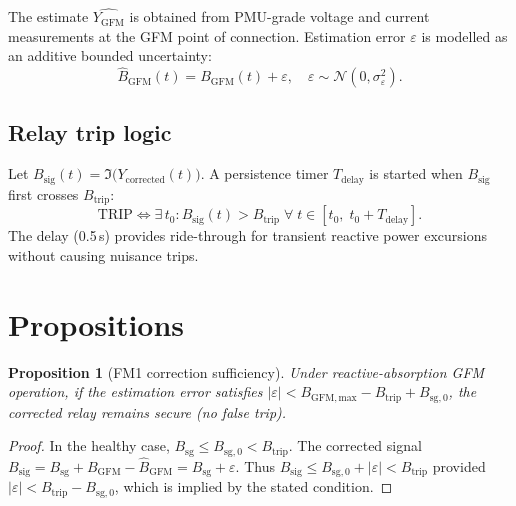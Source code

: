 \documentclass[11pt,a4paper]{article}
\newtheorem{proposition}{Proposition}
\newcommand{\YGFM}{Y_{\mathrm{GFM}}}
\newcommand{\Btrip}{B_{\mathrm{trip}}}
\begin{document}
The estimate $\widehat{\YGFM}$ is obtained from PMU-grade voltage and current
measurements at the GFM point of connection.  Estimation error $\varepsilon$
is modelled as an additive bounded uncertainty:
\begin{equation}
  \widehat{B}_{\mathrm{GFM}}(t) = B_{\mathrm{GFM}}(t) + \varepsilon, \quad
  \varepsilon \sim \mathcal{N}(0, \sigma_\varepsilon^2).
  \label{eq:est_error}
\end{equation}

\subsection{Relay trip logic}
\label{sec:trip}

Let $B_{\mathrm{sig}}(t) = \Im\bigl(Y_{\mathrm{corrected}}(t)\bigr)$.  A
persistence timer $T_{\mathrm{delay}}$ is started when $B_{\mathrm{sig}}$
first crosses $\Btrip$:
\begin{equation}
  \text{TRIP} \iff \exists\, t_0 : B_{\mathrm{sig}}(t) > \Btrip
  \;\forall\; t \in [t_0,\; t_0 + T_{\mathrm{delay}}].
  \label{eq:trip}
\end{equation}
The delay (0.5\,s) provides ride-through for transient reactive power
excursions without causing nuisance trips.

\section{Propositions}
\label{sec:propositions}

\begin{proposition}[FM1 correction sufficiency]
  \label{prop:fm1}
  Under reactive-absorption GFM operation, if the estimation error satisfies
  $|\varepsilon| < B_{\mathrm{GFM,max}} - \Btrip + B_{\mathrm{sg,0}}$, the
  corrected relay remains secure (no false trip).
\end{proposition}

\begin{proof}
  In the healthy case, $B_{\mathrm{sg}} \leq B_{\mathrm{sg,0}} < \Btrip$.
  The corrected signal $B_{\mathrm{sig}} = B_{\mathrm{sg}} + B_{\mathrm{GFM}}
  - \widehat{B}_{\mathrm{GFM}} = B_{\mathrm{sg}} + \varepsilon$.
  Thus $B_{\mathrm{sig}} \leq B_{\mathrm{sg,0}} + |\varepsilon| < \Btrip$
  provided $|\varepsilon| < \Btrip - B_{\mathrm{sg,0}}$, which is implied by
  the stated condition.
\end{proof}
\end{document}
